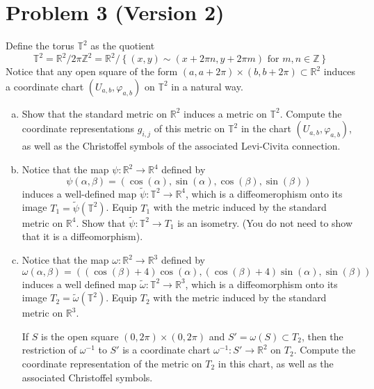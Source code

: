 \documentclass[a4paper]{article}
\begin{document}
\section*{Problem 3 (Version 2)}%

Define the torus $\mathds{T}^2$ as the quotient
\[
  \mathds{T}^2 = \mathds{R}^2 / 2\pi \mathds{Z}^2 = \mathds{R}^2 / \left\{ (x,y) \sim (x+2\pi n, y+2\pi m)\text{ for } m,n \in \mathds{Z} \right\}
\]
Notice that any open square of the form $(a, a+2\pi) \times (b, b+2\pi) \subset \mathds{R}^2$ induces a coordinate chart $(U_{a,b}, \varphi_{a,b})$ on $\mathds{T}^2$ in a natural way.

\begin{enumerate}[(a)]
  \item Show that the standard metric on $\mathds{R}^2$ induces a metric on $\mathds{T}^2$. Compute the coordinate representations $g_{i,j}$ of this metric on $\mathds{T}^2$ in the chart $(U_{a,b}, \varphi_{a,b})$, as well as the Christoffel symbols of the associated Levi-Civita connection.
  \item Notice that the map $\psi: \mathds{R}^2 \rightarrow \mathds{R}^4$ defined by 
    \[
      \psi(\alpha,\beta) = (\cos(\alpha), \sin(\alpha), \cos(\beta), \sin(\beta))
    \]
    induces a well-defined map $\tilde{\psi}: \mathds{T}^2 \rightarrow \mathds{R}^4$, which is a diffeomerophism onto its image $T_1 = \tilde{\psi}(\mathds{T}^2)$. Equip $T_1$ with the metric induced by the standard metric on $\mathds{R}^4$. Show that $\tilde{\psi}: \mathds{T}^2 \rightarrow T_1$ is an isometry. (You do not need to show that it is a diffeomorphism).
  \item Notice that the map $\omega: \mathds{R}^2 \rightarrow \mathds{R}^3$ defined by
    \[
      \omega(\alpha,\beta) = ((\cos(\beta) + 4)\cos(\alpha), (\cos(\beta) + 4)\sin(\alpha) , \sin(\beta))
    \]
    induces a well defined map $\tilde{\omega}: \mathds{T}^2 \rightarrow \mathds{R}^3$, which is a diffeomorphism onto its image $T_2 = \tilde{\omega}(\mathds{T}^2)$. Equip $T_2$ with the metric induced by the standard metric on $\mathds{R}^3$.

    If $S$ is the open square $(0, 2\pi) \times (0, 2\pi)$ and $S' = \omega(S) \subset T_2$, then the restriction of $\omega^{-1}$ to $S'$ is a coordinate chart $\omega^{-1}: S' \rightarrow \mathds{R}^2$ on $T_2$. Compute the coordinate representation of the metric on $T_2$ in this chart, as well as the associated Christoffel symbols.
\end{enumerate}
\end{document}
